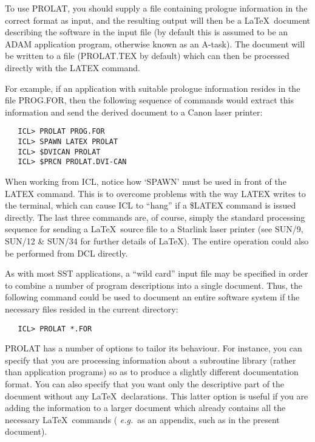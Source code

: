 To use PROLAT, you should supply a file containing prologue information in
the correct format as input, and the resulting output will then be a \LaTeX\
document describing the software in the input file (by default this is
assumed to be an ADAM application program, otherwise known as an A-task).
The document will be written to a file (PROLAT.TEX by default) which can
then be processed directly with the LATEX command.

For example, if an application with suitable prologue information resides in
the file PROG.FOR, then the following sequence of commands would extract this
information and send the derived document to a Canon laser printer:

\begin{verbatim}
   ICL> PROLAT PROG.FOR
   ICL> SPAWN LATEX PROLAT
   ICL> $DVICAN PROLAT
   ICL> $PRCN PROLAT.DVI-CAN
\end{verbatim}

When working from ICL, notice how `SPAWN' must be used in front of the LATEX
command.
This is to overcome problems with the way LATEX writes to the terminal, which
can cause ICL to ``hang'' if a \$LATEX command is issued directly.
The last three commands are, of course, simply the standard processing
sequence for sending a \LaTeX\ source file to a Starlink laser printer (see
SUN/9, SUN/12 \& SUN/34 for further details of \LaTeX).
The entire operation could also be performed from DCL directly.

As with most SST applications, a ``wild card'' input file may be specified
in order to combine a number of program descriptions into a single document.
Thus, the following command could be used to document an entire software
system if the necessary files resided in the current directory:

\begin{verbatim}
   ICL> PROLAT *.FOR
\end{verbatim}

PROLAT has a number of options to tailor its behaviour.
For instance, you can specify that you are processing information about a
subroutine library (rather than application programs) so as to produce a
slightly different documentation format.
You can also specify that you want only the descriptive part of the document
without any \LaTeX\ declarations.
This latter option is useful if you are adding the information to a larger
document which already contains all the necessary \LaTeX\ commands ({\em
e.g.}\ as an appendix, such as in the present document).

